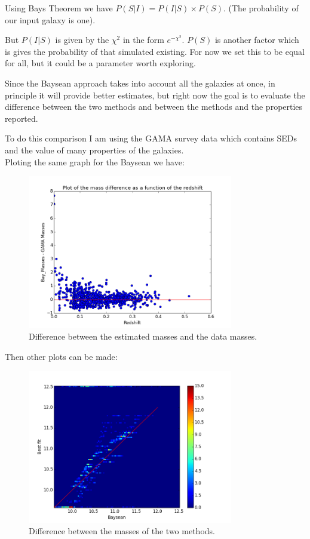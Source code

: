 \documentclass[11pt]{report}
\begin{document}
Using Bays Theorem we have $P(S|I) = P(I|S) \times P(S)$. (The probability of our input galaxy is one).

But $P(I|S)$ is given by the $\chi^2$  in the form $e^{-\chi^2}$. $P(S)$ is another factor which is gives the probability of that simulated existing. For now we set this to be equal for all, but it could be a parameter worth exploring.

Since the Baysean approach takes into account all the galaxies at once, in principle it will provide better estimates, but right now the goal is to evaluate the difference between the two methods and between the methods and the properties reported.

To do this comparison I am using the GAMA survey data which contains SEDs and the value of many properties of the galaxies.\\

Ploting the same graph for the Baysean we have:

\begin{figure}[H]
\centering
\includegraphics[width = 0.8\textwidth]{Results_Bay/diff_red.png}
\caption{Difference between the estimated masses and the data masses.}
\end{figure}

Then other plots can be made:

\begin{figure}[H]
\centering
\includegraphics[width = 0.8\textwidth]{Results_Bay/Bay-Best.png}
\caption{Difference between the masses of the two methods.}
\end{figure}
\end{document}
